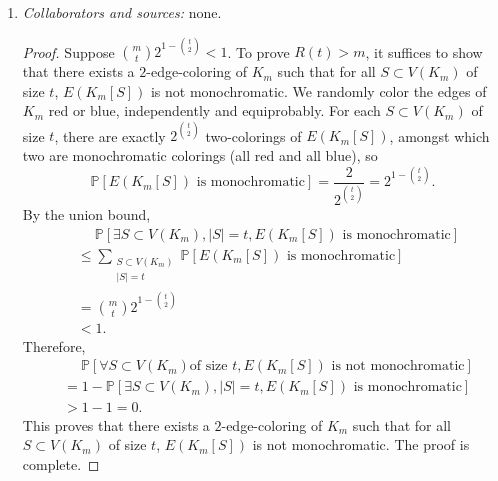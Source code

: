 \documentclass[letterpaper, reqno,11pt]{article}
\newcommand{\PP}{\mathbb{P}}
\begin{document}
\begin{enumerate}
  \clearpage

  \item \noindent\emph{Collaborators and sources:} none.

  \bigskip

  \begin{proof}
    Suppose $\binom{m}{t} 2^{1 - \binom{t}{2}} < 1$. To prove $R(t) > m$, it suffices to show that there exists a $2$-edge-coloring of $K_m$ such that for all $S \subset V(K_m)$ of size $t$, $E(K_m[S])$ is not monochromatic. We randomly color the edges of $K_m$ red or blue, independently and equiprobably. For each $S \subset V(K_m)$ of size $t$, there are exactly $2^{\binom{t}{2}}$ two-colorings of $E(K_m[S])$, amongst which two are monochromatic colorings (all red and all blue), so
    $$ \PP\left[\text{$E\left(K_m[S]\right)$ is monochromatic}\right] = \frac{2}{2^{\binom{t}{2}}} = 2^{1 - \binom{t}{2}}. $$
    By the union bound,
    \begin{align*}
      &\quad \; \PP\left[\exists S \subset V\left(K_m\right), |S| = t, \text{$E\left(K_m[S]\right)$ is monochromatic}\right] \\
      &\leq \sum_{\substack{S \subset V\left(K_m\right) \\ |S| = t}} \PP\left[\text{$E\left(K_m[S]\right)$ is monochromatic}\right] \\
      &= \binom{m}{t} 2^{1 - \binom{t}{2}} \\
      &< 1.
    \end{align*}
    Therefore,
    \begin{align*}
      &\quad\; \PP\left[\forall S \subset V\left(K_m\right) \text{of size $t$}, \text{$E\left(K_m[S]\right)$ is not monochromatic}\right] \\
      &= 1 - \PP\left[\exists S \subset V\left(K_m\right), |S| = t, \text{$E\left(K_m[S]\right)$ is monochromatic}\right] \\
      &> 1 - 1 = 0.
    \end{align*}
    This proves that there exists a $2$-edge-coloring of $K_m$ such that for all $S \subset V(K_m)$ of size $t$, $E(K_m[S])$ is not monochromatic. The proof is complete.
  \end{proof}

  \clearpage


\end{enumerate}
\end{document}
